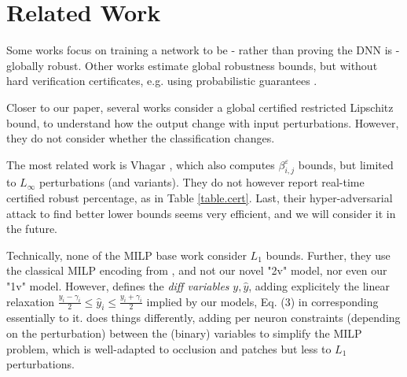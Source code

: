 \section{Related Work}

Some works \cite{Leino,Zhang22a,Sun22,Chen21,REGLO} focus on training a network to be - rather than proving the DNN is - globally robust.
Other works \cite{Bastani16,Ruan19,Gopinath18} estimate global robustness bounds, but without hard verification certificates, e.g. using probabilistic guarantees 
\cite{Levy23,Mangal19}.

Closer to our paper, several works  \cite{Marabou,lipshitz,GROCET} consider a global certified restricted Lipschitz bound, to understand how the output change with input perturbations. However, they do not consider whether the classification changes. 

The most related work is Vhagar \cite{vhagar}, which also computes $\beta^\varepsilon_{i,j}$ bounds, but limited to $L_\infty$ perturbations (and variants). They do not however report real-time certified robust percentage, as in Table \ref{table.cert}. Last, their hyper-adversarial attack to find better lower bounds seems very efficient, and we will consider it in the future.

Technically, none of the MILP base work \cite{vhagar,ITNE} 
consider $L_1$ bounds. Further, they use the classical MILP encoding from \cite{MILP}, and not our novel "2v" model, nor even our "1v" model. However, \cite{ITNE} 
defines the {\em diff variables} $y,\hat{y}$, adding explicitely the linear relaxation $\frac{y_i-\gamma_i}{2} \leq \hat{y}_i \leq \frac{y_i+\gamma_i}{2}$ implied by our models, Eq. (3) in \cite{ITNE} corresponding essentially to it. \cite{vhagar} does things differently, adding per neuron constraints (depending on the perturbation) between the (binary) variables to simplify the MILP problem, which is well-adapted to occlusion and patches but less to $L_1$ perturbations. 

